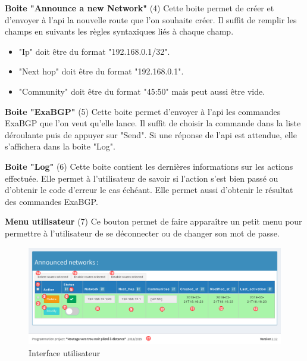 \textbf{Boite "Announce a new Network"} (4)\newline
Cette boite permet de créer et d'envoyer à l'api la nouvelle route que l'on souhaite créer. Il suffit de remplir les champs en suivants les règles syntaxiques liés à chaque champ.
\begin{itemize}
    \item "Ip" doit être du format "192.168.0.1/32".
    \item "Next hop" doit être du format "192.168.0.1".
    \item "Community" doit être du format "45:50" mais peut aussi être vide.\newline
\end{itemize}

\textbf{Boite "ExaBGP"} (5)\newline
Cette boite permet d'envoyer à l'api les commandes ExaBGP que l'on veut qu'elle lance. Il suffit de choisir la commande dans la liste déroulante puis de appuyer sur "Send". Si une réponse de l'api est attendue, elle s'affichera dans la boite "Log".\newline

\textbf{Boite "Log"} (6)\newline
Cette boite contient les dernières informations sur les actions effectuée. Elle permet à l'utilisateur de savoir si l'action s'est bien passé ou d'obtenir le code d'erreur le cas échéant.
Elle permet aussi d'obtenir le résultat des commandes ExaBGP.\newline

\textbf{Menu utilisateur} (7)\newline
Ce bouton permet de faire apparaître un petit menu pour permettre à l'utilisateur de se déconnecter ou de changer son mot de passe.

\begin{figure}[H]
    \includegraphics[width=\textwidth]{medias/ui_lower_marked.png}
    \caption{Interface utilisateur}
    \label{fig:ui_lower}
\end{figure}

